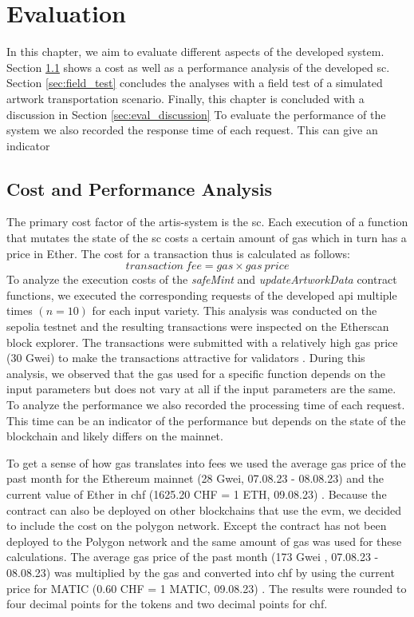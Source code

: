 \chapter{Evaluation}
\label{chap:evaluation}
In this chapter, we aim to evaluate different aspects of the developed system. Section \ref{sec:cost_and_performance} shows a cost as well as a performance analysis of the developed \gls{sc}. Section \ref{sec:field_test} concludes the analyses with a field test of a simulated artwork transportation scenario. Finally, this chapter is concluded with a discussion in Section \ref{sec:eval_discussion} To evaluate the performance of the system we also recorded the response time of each request. This can give an indicator

\section{Cost and Performance Analysis}
\label{sec:cost_and_performance}
The primary cost factor of the artis-system is the \gls{sc}. Each execution of a function that mutates the state of the \gls{sc} costs a certain amount of gas which in turn has a price in Ether. The cost for a transaction thus is calculated as follows:
$$
transaction\ fee = gas \times gas\ price
$$
To analyze the execution costs of the \textit{safeMint} and \textit{updateArtworkData} contract functions, we executed the corresponding requests of the developed \gls{api} multiple times $(n = 10)$ for each input variety. This analysis was conducted on the sepolia testnet and the resulting transactions were inspected on the Etherscan block explorer. The transactions were submitted with a relatively high gas price (30 Gwei) to make the transactions attractive for validators \cite{ethergas}. During this analysis, we observed that the gas used for a specific function depends on the input parameters but does not vary at all if the input parameters are the same. To analyze the performance we also recorded the processing time of each request. This time can be an indicator of the performance but depends on the state of the blockchain and likely differs on the mainnet.

To get a sense of how gas translates into fees we used the average gas price of the past month for the Ethereum mainnet (28 Gwei, 07.08.23 - 08.08.23) \cite{gaspriceaverageethereum} and the current value of Ether in \gls{chf} (1625.20 CHF = 1 ETH, 09.08.23) \cite{coinmarketcap}. Because the contract can also be deployed on other blockchains that use the \gls{evm}, we decided to include the cost on the polygon network. Except the contract has not been deployed to the Polygon network and the same amount of gas was used for these calculations. The average gas price of the past month (173 Gwei \cite{gaspriceaveragepolygon}, 07.08.23 - 08.08.23) was multiplied by the gas and converted into \gls{chf} by using the current price for MATIC (0.60 CHF = 1 MATIC, 09.08.23) \cite{coinmarketcap}. The results were rounded to four decimal points for the tokens and two decimal points for \gls{chf}.

